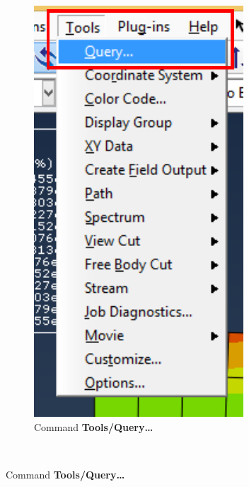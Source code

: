 \begin{enumerate}
\begin{figure}[H]
\begin{subfigure}{0.29\textwidth}
      \includegraphics[width=\textwidth]{./body/images/imagen88.pdf}
      \caption{Command \textbf{Tools/Query\ldots}}
      \label{figu88}
    \end{subfigure}%
    ~ %

\end{figure}
\end{enumerate}
